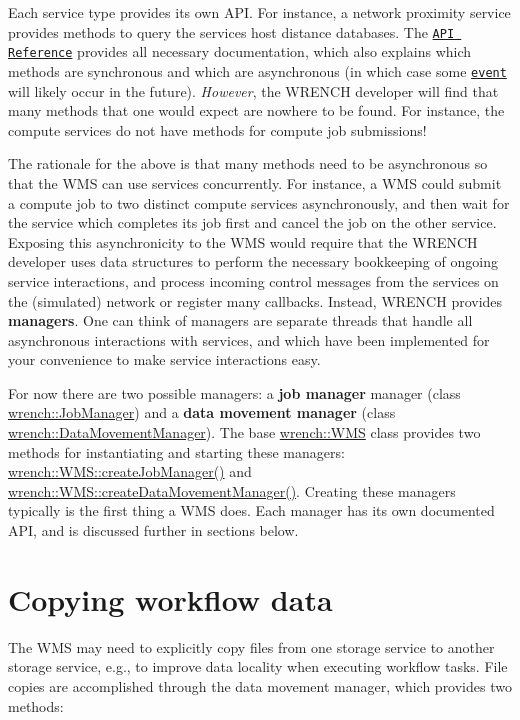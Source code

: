 Each service type provides its own A\+PI. For instance, a network proximity service provides methods to query the service\textquotesingle{}s host distance databases. The \href{./annotated.html}{\tt A\+PI Reference} provides all necessary documentation, which also explains which methods are synchronous and which are asynchronous (in which case some \href{#wrench-101-WMS-events}{\tt event} will likely occur in the future). {\itshape However}, the W\+R\+E\+N\+CH developer will find that many methods that one would expect are nowhere to be found. For instance, the compute services do not have methods for compute job submissions!

The rationale for the above is that many methods need to be asynchronous so that the W\+MS can use services concurrently. For instance, a W\+MS could submit a compute job to two distinct compute services asynchronously, and then wait for the service which completes its job first and cancel the job on the other service. Exposing this asynchronicity to the W\+MS would require that the W\+R\+E\+N\+CH developer uses data structures to perform the necessary bookkeeping of ongoing service interactions, and process incoming control messages from the services on the (simulated) network or register many callbacks. Instead, W\+R\+E\+N\+CH provides {\bfseries managers}. One can think of managers are separate threads that handle all asynchronous interactions with services, and which have been implemented for your convenience to make service interactions easy.

For now there are two possible managers\+: a {\bfseries job manager} manager (class {\ttfamily \hyperlink{classwrench_1_1_job_manager}{wrench\+::\+Job\+Manager}}) and a {\bfseries data movement manager} (class {\ttfamily \hyperlink{classwrench_1_1_data_movement_manager}{wrench\+::\+Data\+Movement\+Manager}}). The base {\ttfamily \hyperlink{classwrench_1_1_w_m_s}{wrench\+::\+W\+MS}} class provides two methods for instantiating and starting these managers\+: {\ttfamily \hyperlink{classwrench_1_1_w_m_s_a3f1a1451efda2a41d2d96a41cf229698}{wrench\+::\+W\+M\+S\+::create\+Job\+Manager()}} and {\ttfamily \hyperlink{classwrench_1_1_w_m_s_aaf8902aadfd0542509cd0cae5519bcf3}{wrench\+::\+W\+M\+S\+::create\+Data\+Movement\+Manager()}}. Creating these managers typically is the first thing a W\+MS does. Each manager has its own documented A\+PI, and is discussed further in sections below.\hypertarget{wrench-101_wrench-101-WMS-data}{}\section{Copying workflow data}\label{wrench-101_wrench-101-WMS-data}
The W\+MS may need to explicitly copy files from one storage service to another storage service, e.\+g., to improve data locality when executing workflow tasks. File copies are accomplished through the data movement manager, which provides two methods\+:


